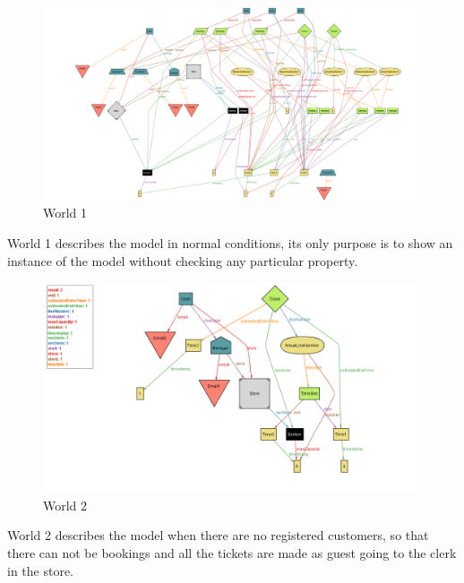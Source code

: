 \begin{figure}[H]
    \centering
    \hspace*{-3.5cm}
    \includegraphics[height=0.7\textwidth]{Images/world1.png}
    \caption{World 1}
\end{figure}

World 1 describes the model in normal conditions, its only purpose is to show an instance of the model without checking
any particular property.

\begin{figure}[H]
    \centering
    \includegraphics[height=0.5\textwidth]{Images/world2.png}
    \caption{World 2}
\end{figure}

World 2 describes the model when there are no registered customers, so that there can not be bookings and all the
tickets are made as guest going to the clerk in the store.

